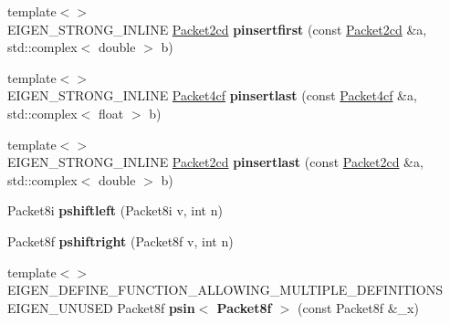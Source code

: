 \begin{DoxyCompactItemize}
\item 
\mbox{\label{namespace_eigen_1_1internal_aff73318ada204f943076746d0b807ef6}} 
{\footnotesize template$<$$>$ }\\E\+I\+G\+E\+N\+\_\+\+S\+T\+R\+O\+N\+G\+\_\+\+I\+N\+L\+I\+NE \hyperlink{struct_eigen_1_1internal_1_1_packet2cd}{Packet2cd} {\bfseries pinsertfirst} (const \hyperlink{struct_eigen_1_1internal_1_1_packet2cd}{Packet2cd} \&a, std\+::complex$<$ double $>$ b)
\item 
\mbox{\label{namespace_eigen_1_1internal_a52c9d147b4fc071e867397f5ff60cedd}} 
{\footnotesize template$<$$>$ }\\E\+I\+G\+E\+N\+\_\+\+S\+T\+R\+O\+N\+G\+\_\+\+I\+N\+L\+I\+NE \hyperlink{struct_eigen_1_1internal_1_1_packet4cf}{Packet4cf} {\bfseries pinsertlast} (const \hyperlink{struct_eigen_1_1internal_1_1_packet4cf}{Packet4cf} \&a, std\+::complex$<$ float $>$ b)
\item 
\mbox{\label{namespace_eigen_1_1internal_ac06b6f829c865e8e0e3ec9946aa18ed1}} 
{\footnotesize template$<$$>$ }\\E\+I\+G\+E\+N\+\_\+\+S\+T\+R\+O\+N\+G\+\_\+\+I\+N\+L\+I\+NE \hyperlink{struct_eigen_1_1internal_1_1_packet2cd}{Packet2cd} {\bfseries pinsertlast} (const \hyperlink{struct_eigen_1_1internal_1_1_packet2cd}{Packet2cd} \&a, std\+::complex$<$ double $>$ b)
\item 
\mbox{\label{namespace_eigen_1_1internal_a703341af57db8439ae9690870449daea}} 
Packet8i {\bfseries pshiftleft} (Packet8i v, int n)
\item 
\mbox{\label{namespace_eigen_1_1internal_ae85fcab638e4045f96483b1529cd14c9}} 
Packet8f {\bfseries pshiftright} (Packet8f v, int n)
\item 
\mbox{\label{namespace_eigen_1_1internal_af88cef0a5c3be48205d37003d50fb5e9}} 
{\footnotesize template$<$$>$ }\\E\+I\+G\+E\+N\+\_\+\+D\+E\+F\+I\+N\+E\+\_\+\+F\+U\+N\+C\+T\+I\+O\+N\+\_\+\+A\+L\+L\+O\+W\+I\+N\+G\+\_\+\+M\+U\+L\+T\+I\+P\+L\+E\+\_\+\+D\+E\+F\+I\+N\+I\+T\+I\+O\+NS E\+I\+G\+E\+N\+\_\+\+U\+N\+U\+S\+ED Packet8f {\bfseries psin$<$ Packet8f $>$} (const Packet8f \&\+\_\+x)

\end{DoxyCompactItemize}
